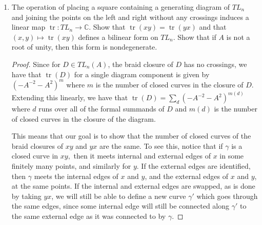 \documentclass{article}
\def\C{\mathbb{C}}
\begin{document}
\begin{enumerate}
\begin{proof}
      \begin{align*}
        S_mS_n &= x\sum_{\substack{a=2\\a \text{ even}}}^{N-1} S_a - \sum_{\substack{a=1\\a \text{ odd}}}^{N-2}S_a\\
        &=\sum_{\substack{a=2\\ a \text{ even}}}^{N} xS_a-S_{a-1}\\
        &= \sum_{\substack{a=2\\ a \text{ even}}}^{N} S_{a+1}\\
        &= \sum_{\substack{a=1\\ a\text{ odd}}}^{N}S_a
      \end{align*} 
      exactly as needed. The proof for $m+n$ even is essentially identical, so we are done.
    \end{proof}
    \item The operation of placing a square containing a generating diagram of $TL_n$ and joining the points on the left and right without any crossings induces a linear map $\operatorname*{tr}:TL_n\to \C$. Show that $\operatorname*{tr}(xy) = \operatorname*{tr}(yx)$ and that $(x,y)\mapsto \operatorname*{tr}(xy)$ defines a bilinear form on $TL_n$. Show that if $A$ is not a root of unity, then this form is nondegenerate. 
    \begin{proof}
      Since for $D\in TL_n(A)$, the braid closure of $D$ has no crossings, we have that $\operatorname*{tr}(D)$ for a single diagram component is given by $(-A^{-2}-A^2)^m$ where $m$ is the number of closed curves in the closure of $D$. Extending this linearly, we have that $\operatorname*{tr}(D) = \sum_{d}(-A^{-2}-A^2)^{m(d)}$ where $d$ runs over all of the formal summands of $D$ and $m(d)$ is the number of closed curves in the closure of the diagram. \smallskip

      This means that our goal is to show that the number of closed curves of the braid closures of $xy$ and $yx$ are the same. To see this, notice that if $\gamma$ is a closed curve in $xy,$ then it meets internal and external edges of $x$ in some finitely many points, and similarly for $y.$ If the external edges are identified, then $\gamma$ meets the internal edges of $x$ and $y$, and the external edges of $x$ and $y$, at the same points. If the internal and external edges are swapped, as is done by taking $yx$, we will still be able to define a new curve $\gamma'$ which goes through the same edges, since some internal edge will still be connected along $\gamma'$ to the same external edge as it was connected to by $\gamma.$ \smallskip


\end{proof}
\end{enumerate}
\end{document}
